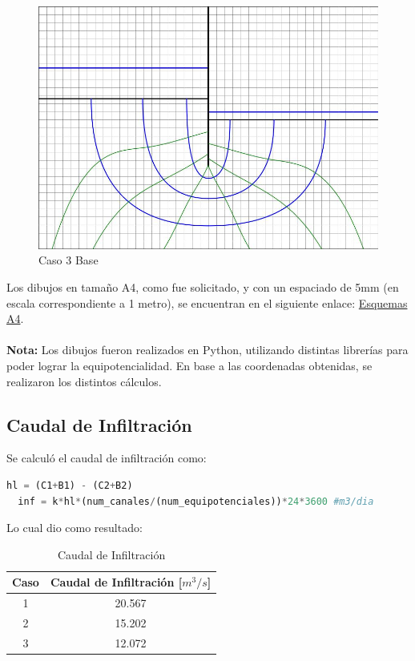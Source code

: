 \begin{figure}[H]
\begin{minipage}{0.32\textwidth}
      \includegraphics[width=\textwidth]{FOTOS/caso_3dibujo_base.jpg}
      \caption{Caso 3 Base}
  \end{minipage}
\end{figure}

Los dibujos en tamaño A4, como fue solicitado, y con un espaciado de 5mm (en escala correspondiente a 1 metro), se encuentran en el siguiente enlace: \href{https://github.com/LukasWolff2002/PROYECTO_1_MCOC/tree/main/DIBUJOS_A4}{Esquemas A4}.
\\ \\
\textbf{Nota:} Los dibujos fueron realizados en Python, utilizando distintas librerías para poder lograr la equipotencialidad. En base a las coordenadas obtenidas, se realizaron los distintos cálculos.

\newpage
\subsection{Caudal de Infiltración}

Se calculó el caudal de infiltración como:

\begin{lstlisting}[language=Python]
  hl = (C1+B1) - (C2+B2)
  inf = k*hl*(num_canales/(num_equipotenciales))*24*3600 #m3/dia
\end{lstlisting}

Lo cual dio como resultado:

\begin{table}[H]
  \centering
  \begin{tabular}{|c|c|}
    \hline
    Caso & Caudal de Infiltración [$m^3/s$] \\
    \hline
    1 & 20.567 \\ \hline
    2 & 15.202 \\ \hline
    3 & 12.072 \\
    \hline
  \end{tabular}
  \caption{Caudal de Infiltración}
\end{table}

